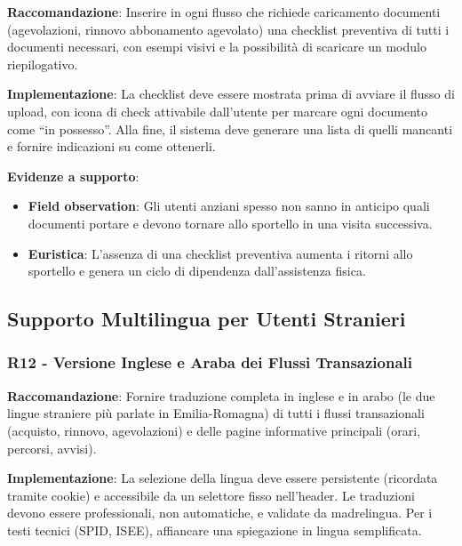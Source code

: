 \documentclass[11pt,a4paper]{article}
\begin{document}
\textbf{Raccomandazione}: Inserire in ogni flusso che richiede caricamento
documenti (agevolazioni, rinnovo abbonamento agevolato) una checklist
preventiva di tutti i documenti necessari, con esempi visivi e la possibilit\`a
di scaricare un modulo riepilogativo.

\textbf{Implementazione}: La checklist deve essere mostrata prima di avviare
il flusso di upload, con icona di check attivabile dall'utente per marcare
ogni documento come “in possesso”. Alla fine, il sistema deve generare una
lista di quelli mancanti e fornire indicazioni su come ottenerli.

\textbf{Evidenze a supporto}:
\begin{itemize}
    \item \textbf{Field observation}: Gli utenti anziani spesso non sanno in
    anticipo quali documenti portare e devono tornare allo sportello in una
    visita successiva.
    \item \textbf{Euristica}: L'assenza di una checklist preventiva aumenta
    i ritorni allo sportello e genera un ciclo di dipendenza dall'assistenza
    fisica.
\end{itemize}



\subsection{Supporto Multilingua per Utenti Stranieri}

\subsubsection{R12 - Versione Inglese e Araba dei Flussi Transazionali}
\label{rec:R12}

\textbf{Raccomandazione}: Fornire traduzione completa in inglese e in arabo
(le due lingue straniere pi\`u parlate in Emilia-Romagna) di tutti i flussi
transazionali (acquisto, rinnovo, agevolazioni) e delle pagine informative
principali (orari, percorsi, avvisi).

\textbf{Implementazione}: La selezione della lingua deve essere persistente
(ricordata tramite cookie) e accessibile da un selettore fisso nell'header.
Le traduzioni devono essere professionali, non automatiche, e validate da
madrelingua. Per i testi tecnici (SPID, ISEE), affiancare una spiegazione
in lingua semplificata.
\end{document}
